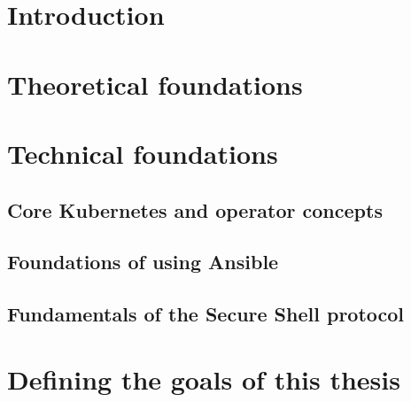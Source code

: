 \documentclass[
	12pt, %
	a4paper,
	liststotoc, %
	bibtotoc, %
	pointlessnumbers, %
	headsepline, %
	footsepline, %
	oneside %
	]{scrbook} %
\begin{document}
\listoffigures
\lstlistoflistings
\printnoidxglossary[type=\acronymtype, style=long]
\clearpage



\chapter{Introduction}
\label{ch:intro}


\chapter{Theoretical foundations}
\label{ch:theory}


\chapter{Technical foundations}
\label{ch:technical}


\section{Core Kubernetes and operator concepts}


\section{Foundations of using Ansible}


\section{Fundamentals of the Secure Shell protocol}


\chapter{Defining the goals of this thesis}
\label{ch:goals}

\end{document}

